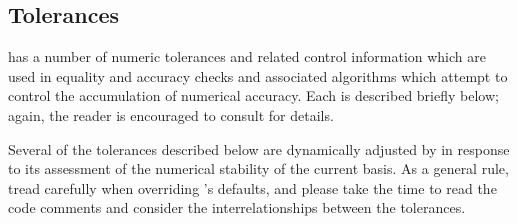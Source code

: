 \subsection{\dylp Tolerances}
\label{DylpTolerances}

\dylp has a number of numeric tolerances and related control information
which are used in equality and accuracy checks and associated algorithms
which attempt to control the accumulation of numerical accuracy.
Each is described briefly below; again, the reader is encouraged to consult
 for details.

Several of the tolerances described below are dynamically adjusted by \dylp
in response to its assessment of the numerical stability of the current
basis.
As a general rule, tread carefully when overriding \dylp's defaults, and
please take the time to read the code comments and consider the
interrelationships between the tolerances.

